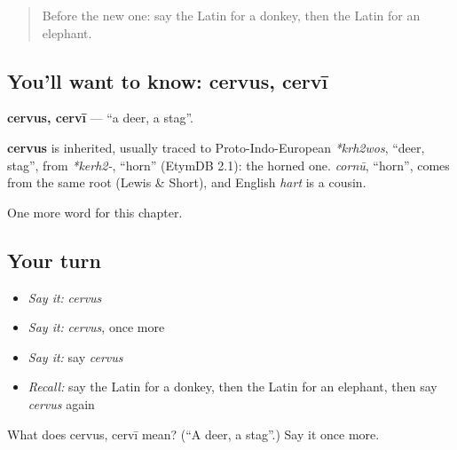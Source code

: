 \begin{quote}
Before the new one: say the Latin for a donkey, then the Latin for an elephant.
\end{quote}

\subsection*{You'll want to know: cervus, cervī}
\textbf{cervus, cervī} — \textquotedblleft{}a deer, a stag\textquotedblright{}.

\begin{cousinweb}
\textbf{cervus} is inherited, usually traced to Proto-Indo-European \emph{*krh2wos}, \textquotedblleft{}deer, stag\textquotedblright{}, from \emph{*kerh2-}, \textquotedblleft{}horn\textquotedblright{} (EtymDB 2.1): the horned one. \emph{cornū}, \textquotedblleft{}horn\textquotedblright{}, comes from the same root (Lewis \& Short), and English \emph{hart} is a cousin.
\end{cousinweb}

\begin{grammarlens}[title={What you've built}]
One more word for this chapter.
\end{grammarlens}

\subsection*{Your turn}
\begin{itemize}
\raggedright
  \item \emph{Say it:} \emph{cervus}
  \item \emph{Say it:} \emph{cervus}, once more
  \item \emph{Say it:} say \emph{cervus}
  \item \emph{Recall:} say the Latin for a donkey, then the Latin for an elephant, then say \emph{cervus} again
\end{itemize}

\begin{tcolorbox}[breakable,colback=teal!4,colframe=teal!35!black,title={Before you move on}]
What does cervus, cervī mean? (\textquotedblleft{}A deer, a stag\textquotedblright{}.) Say it once more.
\end{tcolorbox}

